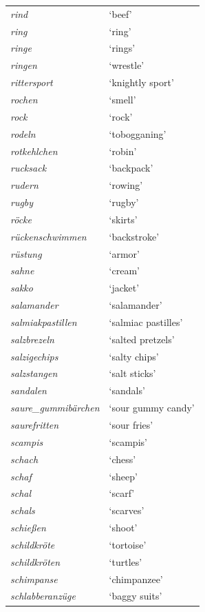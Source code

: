 \begin{longtable}{ll}
\textit{rind} & `beef' \\
\textit{ring} & `ring' \\
\textit{ringe} & `rings' \\
\textit{ringen} & `wrestle' \\
\textit{rittersport} & `knightly sport' \\
\textit{rochen} & `smell' \\
\textit{rock} & `rock' \\
\textit{rodeln} & `tobogganing' \\
\textit{rotkehlchen} & `robin' \\
\textit{rucksack} & `backpack' \\
\textit{rudern} & `rowing' \\
\textit{rugby} & `rugby' \\
\textit{röcke} & `skirts' \\
\textit{rückenschwimmen} & `backstroke' \\
\textit{rüstung} & `armor' \\
\textit{sahne} & `cream' \\
\textit{sakko} & `jacket' \\
\textit{salamander} & `salamander' \\
\textit{salmiakpastillen} & `salmiac pastilles' \\
\textit{salzbrezeln} & `salted pretzels' \\
\textit{salzigechips} & `salty chips' \\
\textit{salzstangen} & `salt sticks' \\
\textit{sandalen} & `sandals' \\
\textit{saure\_gummibärchen} & `sour gummy candy' \\
\textit{saurefritten} & `sour fries' \\
\textit{scampis} & `scampis' \\
\textit{schach} & `chess' \\
\textit{schaf} & `sheep' \\
\textit{schal} & `scarf' \\
\textit{schals} & `scarves' \\
\textit{schießen} & `shoot' \\
\textit{schildkröte} & `tortoise' \\
\textit{schildkröten} & `turtles' \\
\textit{schimpanse} & `chimpanzee' \\
\textit{schlabberanzüge} & `baggy suits' \\

\end{longtable}
